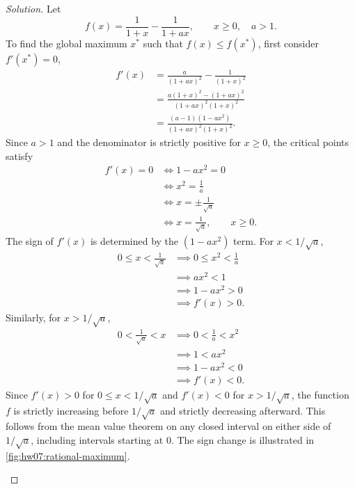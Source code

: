 \begin{proof}[Solution]
  Let
  \[
    f(x)=\frac1{1+x}-\frac1{1+ax},
    \qquad x\ge0,\quad a>1.
  \]
  To find the global maximum $x^*$ such that $f(x)\le f(x^*)$,
  first consider $f'(x^*)=0$,
  \[
    \begin{aligned}
      f'(x)&=\frac{a}{(1+ax)^2}-\frac1{(1+x)^2}\\[6pt]
        &=\frac{a(1+x)^2-(1+ax)^2}{(1+ax)^2(1+x)^2}\\[6pt]
        &=\frac{(a-1)(1-ax^2)}{(1+ax)^2(1+x)^2}.
    \end{aligned}
  \]
  Since $a>1$ and the denominator is strictly positive for $x\ge0$,
  the critical points satisfy
  \[
    \begin{aligned}
      f'(x)=0&\iff 1-ax^2=0\\
        &\iff x^2=\frac1a\\
        &\iff x=\pm\frac1{\sqrt a}\\
        &\iff x=\frac1{\sqrt a},\qquad x\ge0.
    \end{aligned}
  \]
  The sign of $f'(x)$ is determined by the $(1-ax^2)$ term.
  For $x<1/\sqrt a$,
  \[
    \begin{aligned}
      0\le x<\frac1{\sqrt a}
        &\implies 0\le x^2<\frac1a\\
        &\implies ax^2<1\\
        &\implies 1-ax^2>0\\
        &\implies f'(x)>0.
    \end{aligned}
  \]
  Similarly, for $x>1/\sqrt a$,
  \[
    \begin{aligned}
      0<\frac1{\sqrt a}<x
        &\implies 0<\frac1a<x^2\\
        &\implies 1<ax^2\\
        &\implies 1-ax^2<0\\
        &\implies f'(x)<0.
    \end{aligned}
  \]
  Since $f'(x)>0$ for $0\le x<1/\sqrt a$ and $f'(x)<0$ for
  $x>1/\sqrt a$, the function $f$ is strictly increasing before
  $1/\sqrt a$ and strictly decreasing afterward.
  This follows from the mean value theorem on
  any closed interval on either side of $1/\sqrt a$, including
  intervals starting at $0$. The sign change is illustrated in
  \autoref{fig:hw07:rational-maximum}.
  \begin{marginfigure}

\end{marginfigure}
\end{proof}
